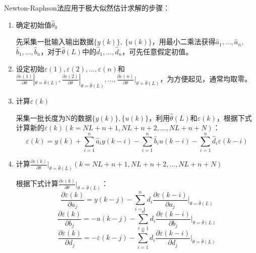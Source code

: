 \documentclass[UTF8]{article}
\begin{document}
Newton-Raphson法应用于极大似然估计求解的步骤：
\begin{enumerate}
    \item 确定初始值$\hat{\theta}_0$
    
    先采集一批输入输出数据$\{ y(k) \},\ \{ u(k) \}$，用最小二乘法获得$\hat{a}_1, ..., \hat{a}_n,$ $\hat{b}_1, ..., \hat{b}_n$，对于$\hat{\theta}(L)$中的$\hat{d}_1, ..., \hat{d}_n$，可先任意假定初值。

    \item 设定初始$\varepsilon(1), \varepsilon(2), ..., \varepsilon(n)$和$\frac{\partial\varepsilon(1)}{\partial\theta}|_{\theta = \hat{\theta}(L)},\frac{\partial\varepsilon(2)}{\partial\theta}|_{\theta = \hat{\theta}(L)}, ..., \frac{\partial\varepsilon(n)}{\partial\theta}|_{\theta = \hat{\theta}(L)}$，为方便起见，通常均取零。
    
    \item 计算$\varepsilon(k)$
    
    采集一批长度为N的数据$\{ y(k) \}, \{ u(k) \}$，利用$\hat{\theta}(L)$和$\varepsilon(k)$，根据下式计算新的$\varepsilon(k)(k = NL + n + 1, NL + n + 2, ..., NL + n + N)$：
    \begin{equation*}
        \varepsilon(k) = y(k) + \sum_{i = 1}^n \hat{a}_iy(k - i) - \sum_{i = 1}^n \hat{b}_iu(k - i) - \sum_{i = 1}^n \hat{d}_i\varepsilon(k - i)
    \end{equation*}

    \item 计算$\frac{\partial \varepsilon(k)}{\partial \theta}|_{\theta = \hat{\theta}(L)}(k = NL + n + 1, NL + n + 2, ..., NL + n + N)$
    
    根据下式计算$\frac{\partial \varepsilon(k)}{\partial \theta}|_{\theta = \hat{\theta}(L)}$：
    \begin{equation*}
        \frac{\partial\varepsilon(k)}{\partial a_j} = y(k - j) - \sum_{i = 1}^n d_i \frac{\partial \varepsilon(k - i)}{\partial a_j}|_{\theta = \hat{\theta}(L)} 
    \end{equation*}
    \begin{equation*}
        \frac{\partial \varepsilon(k)}{\partial b_j} = -u(k - j) - \sum_{i = 1}^n d_i \frac{\partial \varepsilon(k - i)}{\partial b_j}|_{\theta = \hat{\theta}(L)}
    \end{equation*}
    \begin{equation*}
        \frac{\partial \varepsilon(k)}{\partial d_j} = -\varepsilon(k - j) - \sum_{i = 1}^n d_i \frac{\partial \varepsilon(k - i)}{\partial d_j}|_{\theta = \hat{\theta}(L)}
    \end{equation*}


\end{enumerate}
\end{document}
